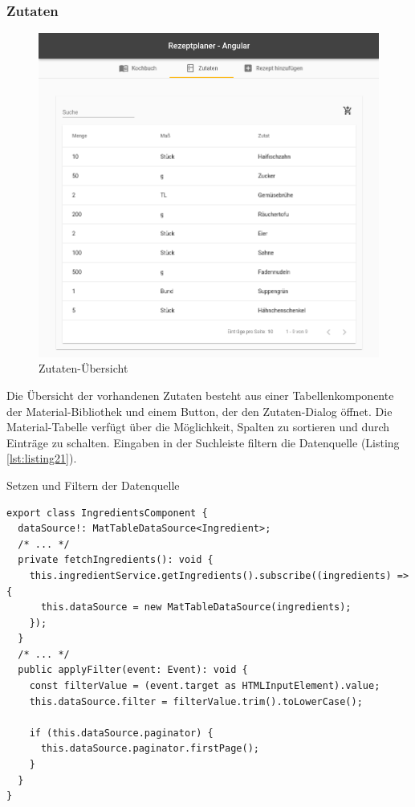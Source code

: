 \subsubsection{Zutaten}
\begin{figure}
  \centering
  \includegraphics[scale=0.5]{Grafiken/03_Implementation/Zutaten_Angular.png}
  \caption{Zutaten-Übersicht}
  \label{fig:zutaten_angular}
\end{figure}

Die Übersicht der vorhandenen Zutaten besteht aus einer Tabellenkomponente der Material-Bibliothek und einem Button, der den Zutaten-Dialog öffnet. Die Material-Tabelle verfügt über die Möglichkeit, Spalten zu sortieren und durch Einträge zu schalten. Eingaben in der Suchleiste filtern die Datenquelle (Listing \ref{lst:listing21}).

\begin{listing}
\caption{Setzen und Filtern der Datenquelle}
\label{lst:listing21}
\begin{verbatim}
export class IngredientsComponent {
  dataSource!: MatTableDataSource<Ingredient>;
  /* ... */
  private fetchIngredients(): void {
    this.ingredientService.getIngredients().subscribe((ingredients) => {
      this.dataSource = new MatTableDataSource(ingredients);
    });
  }
  /* ... */
  public applyFilter(event: Event): void {
    const filterValue = (event.target as HTMLInputElement).value;
    this.dataSource.filter = filterValue.trim().toLowerCase();

    if (this.dataSource.paginator) {
      this.dataSource.paginator.firstPage();
    }
  }
}
\end{verbatim}
\end{listing}

